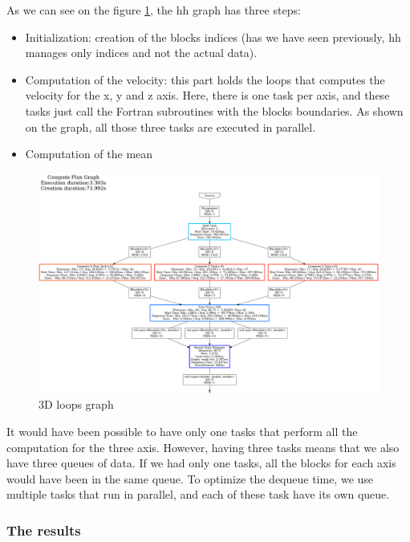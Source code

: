 As we can see on the figure \ref{fig:loopsgraph}, the \gls{hh} graph has three
steps:

\begin{itemize}
  \item Initialization: creation of the blocks indices (has we have seen
    previously, \gls{hh} manages only indices and not the actual data).
  \item Computation of the velocity: this part holds the loops that computes the
    velocity for the x, y and z axis. Here, there is one task per axis, and
    these tasks just call the Fortran subroutines with the blocks boundaries. As
    shown on the graph, all those three tasks are executed in parallel.
  \item Computation of the mean
\end{itemize}

\begin{figure}[h!]
  \begin{center}
    \includegraphics[scale=0.2]{img/fds-loops/graph-61.png}
    \caption{3D loops graph}
    \label{fig:loopsgraph}
  \end{center}
\end{figure}

It would have been possible to have only one tasks that perform all the
computation for the three axis. However, having three tasks means that we also
have three queues of data. If we had only one tasks, all the blocks for each
axis would have been in the same queue. To optimize the dequeue time, we use
multiple tasks that run in parallel, and each of these task have its own queue.

\clearpage{}
\subsubsection{The results}

